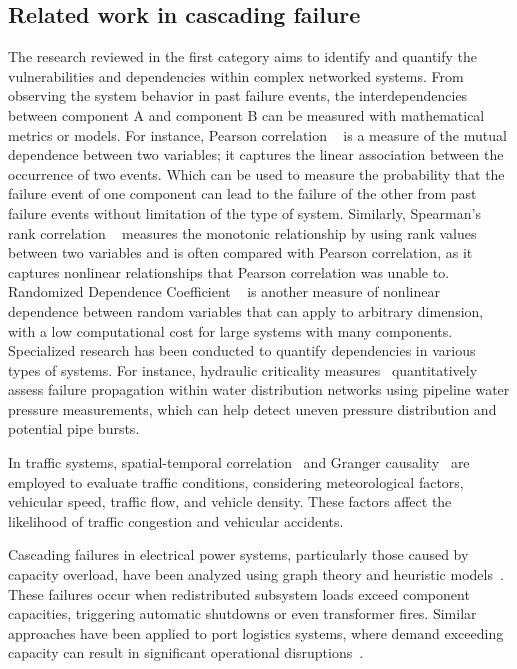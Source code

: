 \documentclass[conference]{IEEEtran}
\begin{document}
\subsection{Related work in cascading failure}
The research reviewed in the first category aims to identify and quantify the vulnerabilities and dependencies within complex networked systems. 
From observing the system behavior in past failure events, the interdependencies between component A and component B can be measured with mathematical metrics or models.
For instance, Pearson correlation ~\cite{modarres_measures_2011} is a measure of the mutual dependence between two variables; it captures the linear association between the occurrence of two events. Which can be used to measure the probability that the failure event of one component can lead to the failure of the other from past failure events without limitation of the type of system. Similarly, Spearman's rank correlation ~\cite{modarres_measures_2011} measures the monotonic relationship by using rank values between two variables and is often compared with Pearson correlation, as it captures nonlinear relationships that Pearson correlation was unable to. Randomized Dependence Coefficient ~\cite{lopez-paz_randomized_2013} is another measure of nonlinear dependence between random variables that can apply to arbitrary dimension, with a low computational cost for large systems with many components. 
Specialized research has been conducted to quantify dependencies in various types of systems. For instance, hydraulic criticality measures~\cite{marlim_hydraulic_2024, jeong_comparative_2020} quantitatively assess failure propagation within water distribution networks using pipeline water pressure measurements, which can help detect uneven pressure distribution and potential pipe bursts.

In traffic systems, spatial-temporal correlation~\cite{du_novel_2021} and Granger causality~\cite{hasan_analysing_2016} are employed to evaluate traffic conditions, considering meteorological factors, vehicular speed, traffic flow, and vehicle density. These factors affect the likelihood of traffic congestion and vehicular accidents.


Cascading failures in electrical power systems, particularly those caused by capacity overload, have been analyzed using graph theory and heuristic models~\cite{xu_cascading_2024, yan_dynamic_2021, zhang_effects_2017, zhang_cascading_2021, nyberg_failure_2015, redacted}. These failures occur when redistributed subsystem loads exceed component capacities, triggering automatic shutdowns or even transformer fires. Similar approaches have been applied to port logistics systems, where demand exceeding capacity can result in significant operational disruptions~\cite{wang_resilience_2026}.
\end{document}
